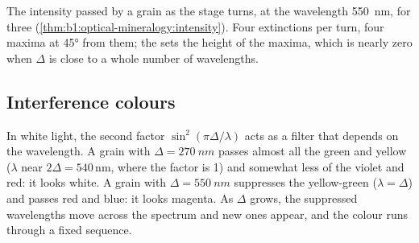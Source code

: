 \begin{omfigure}

{\small The intensity passed by a grain as the stage turns, at the wavelength
\qty{550}{nm}, for three  (\cref{thm:b1:optical-mineralogy:intensity}).
Four extinctions per turn, four maxima at \ang{45} from them; the 
sets the height of the maxima, which is nearly zero when $\Delta$ is close to
a whole number of wavelengths.}
\end{omfigure}

\subsection{Interference colours}

In white light, the second factor $\sin^2(\pi\Delta/\lambda)$ acts as a
filter that depends on the wavelength. A grain with $\Delta = \qty{270}{nm}$
passes almost all the green and yellow ($\lambda$ near $2\Delta = 540$\,nm,
where the factor is 1) and somewhat less of the violet and red: it looks
white. A grain with $\Delta = \qty{550}{nm}$ suppresses the yellow-green
($\lambda = \Delta$) and passes red and blue: it looks magenta. As $\Delta$
grows, the suppressed wavelengths move across the spectrum and new ones
appear, and the colour runs through a fixed sequence.

